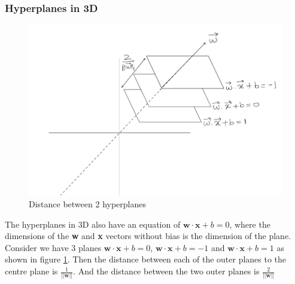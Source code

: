 \documentclass[11pt]{article}
\begin{document}
\subsubsection{Hyperplanes in 3D}
\begin{figure}[h!]
    \centering
  \includegraphics[scale=0.7]{fig3.PNG}
  \caption{Distance between 2 hyperplanes}
  \label{fig:dplane}
\end{figure}
The hyperplanes in 3D also have an equation of $\mathbf{w}\cdot\mathbf{x}+b=0$, where the dimensions of the \textbf{w} and \textbf{x} vectors without bias is the dimension of the plane. Consider we have 3 planes $\mathbf{w}\cdot\mathbf{x}+b=0$, $\mathbf{w}\cdot\mathbf{x}+b=-1$ and $\mathbf{w}\cdot\mathbf{x}+b=1$ as shown in figure \ref{fig:dplane}. Then the distance between each of the outer planes to the centre plane is $\frac{1}{||\mathbf{w}||}$. And the distance between the two outer planes is $\frac{2}{||\mathbf{w}||}$
\end{document}
